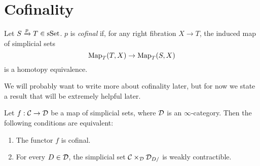 \documentclass[../thesis.tex]{subfiles}
\begin{document}
    \section{Cofinality}
    \begin{definition}\cite[Definition 4.1.1.1]{HTT}
        Let \(S\xrightarrow{p}T \in \mathrm{sSet} \). $p$ is \emph{cofinal} if, for any right fibration $X\to T$, the induced map of simplicial sets
            \[
              \mathrm{Map}_T(T,X) \to \mathrm{Map}_T(S,X)  
            \]
        is a homotopy equivalence.
    \end{definition}
    We will probably want to write more about cofinality later, but for now we state a result that will be extremely helpful later.
    \begin{thm}\cite[Theorem 4.1.3.1]{HTT}
        Let \(f: \mathcal{C} \to \mathcal{D}\) be a map of simplicial sets, where $\mathcal{D}$ is an $\infty$-category.
        Then the following conditions are equivalent:
        \begin{enumerate}
            \item The functor $f$ is cofinal.
            \item For every $D\in \mathcal{D}$, the simplicial set $\mathcal{C}\times_{\mathcal{D}} \mathcal{D}_{D/}$ is weakly contractible.
        \end{enumerate}
    \end{thm}
\end{document}
